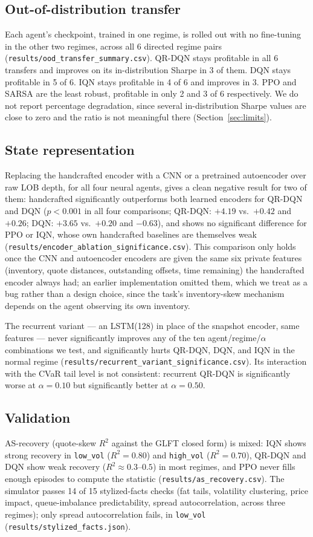 \documentclass[10pt,twocolumn]{article}
\begin{document}
\subsection{Out-of-distribution transfer}
Each agent's checkpoint, trained in one regime, is rolled out with no fine-tuning in the other two regimes, across all 6 directed regime pairs (\texttt{results/ood\_transfer\_summary.csv}). QR-DQN stays profitable in all 6 transfers and improves on its in-distribution Sharpe in 3 of them. DQN stays profitable in 5 of 6. IQN stays profitable in 4 of 6 and improves in 3. PPO and SARSA are the least robust, profitable in only 2 and 3 of 6 respectively. We do not report percentage degradation, since several in-distribution Sharpe values are close to zero and the ratio is not meaningful there (Section~\ref{sec:limits}).

\subsection{State representation}
\label{sec:encoder-results}
Replacing the handcrafted encoder with a CNN or a pretrained autoencoder over raw LOB depth, for all four neural agents, gives a clean negative result for two of them: handcrafted significantly outperforms both learned encoders for QR-DQN and DQN ($p<0.001$ in all four comparisons; QR-DQN: $+4.19$ vs.\ $+0.42$ and $+0.26$; DQN: $+3.65$ vs.\ $+0.20$ and $-0.63$), and shows no significant difference for PPO or IQN, whose own handcrafted baselines are themselves weak (\texttt{results/encoder\_ablation\_significance.csv}). This comparison only holds once the CNN and autoencoder encoders are given the same six private features (inventory, quote distances, outstanding offsets, time remaining) the handcrafted encoder always had; an earlier implementation omitted them, which we treat as a bug rather than a design choice, since the task's inventory-skew mechanism depends on the agent observing its own inventory.

The recurrent variant --- an LSTM(128) in place of the snapshot encoder, same features --- never significantly improves any of the ten agent/regime/$\alpha$ combinations we test, and significantly hurts QR-DQN, DQN, and IQN in the normal regime (\texttt{results/recurrent\_variant\_significance.csv}). Its interaction with the CVaR tail level is not consistent: recurrent QR-DQN is significantly worse at $\alpha=0.10$ but significantly better at $\alpha=0.50$.

\subsection{Validation}
AS-recovery (quote-skew $R^2$ against the GLFT closed form) is mixed: IQN shows strong recovery in \texttt{low\_vol} ($R^2=0.80$) and \texttt{high\_vol} ($R^2=0.70$), QR-DQN and DQN show weak recovery ($R^2\approx0.3$--$0.5$) in most regimes, and PPO never fills enough episodes to compute the statistic (\texttt{results/as\_recovery.csv}). The simulator passes 14 of 15 stylized-facts checks (fat tails, volatility clustering, price impact, queue-imbalance predictability, spread autocorrelation, across three regimes); only spread autocorrelation fails, in \texttt{low\_vol} (\texttt{results/stylized\_facts.json}).
\end{document}
